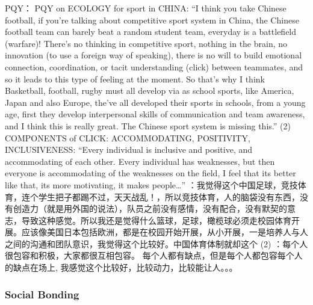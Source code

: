 \begin{CJK}{UTF8}{gbsn}
              PQY：
               PQY on ECOLOGY for sport in CHINA: “I think you take Chinese football, if you’re talking about competitive sport system in China, the Chinese football team can barely beat a random student team, everyday is a battlefield (warfare)! There’s no thinking in competitive sport, nothing in the brain, no innovation (to use a foreign way of speaking), there is no will to build emotional connection, coordination, or tacit understanding (click) between teammates, and so it leads to this type of feeling at the moment.  So that's why I think Basketball, football, rugby must all develop via as school sports, like America, Japan and also Europe, the’ve all developed their sports in schools, from a young age, first they develop interpersonal skills of communication and team awareness, and I think this is really great.  The Chinese sport system is missing this.” (2) COMPONENTS of CLICK: ACCOMMODATING, POSITIVITY, INCLUSIVENESS: “Every individual is inclusive and positive, and accommodating of each other. Every individual has weaknesses, but then everyone is accommodating of the weaknesses on the field, I feel that its better like that, its more motivating, it makes people…”	：我觉得这个中国足球，竞技体育，连个学生把子都踢不过，天天战乱！，所以竞技体育，人的脑袋没有东西，没有创造力（就是用外国的说法），队员之前没有感情，没有配合，没有默契的意志，导致这种感觉。所以我还是觉得什么篮球，足球，橄榄球必须走校园体育开展。应该像美国日本包括欧洲，都是在校园开始开展，从小开展，一是培养人与人之间的沟通和团队意识，我觉得这个比较好。中国体育体制就却这个 (2) ：每个人很包容和积极，大家都很互相包容。 每个人都有缺点，但是每个人都包容每个人的缺点在场上, 我感觉这个比较好，比较动力，比较能让人。。。






























    \subsubsection{Social Bonding}




\end{CJK}
